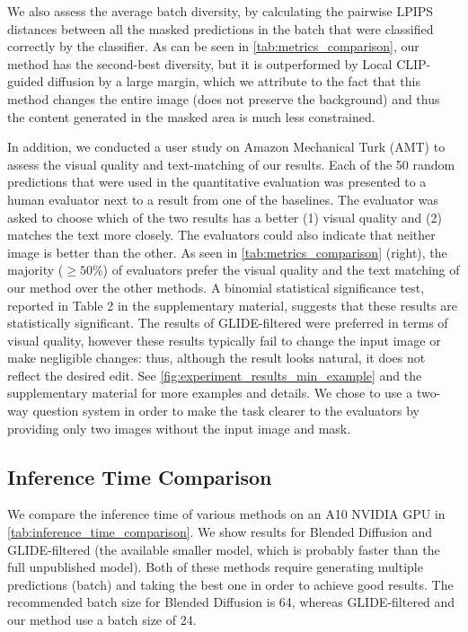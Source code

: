 We also assess the average batch diversity, by calculating the pairwise LPIPS \cite{zhang2018unreasonable} distances between all the masked predictions in the batch that were classified correctly by the classifier. As can be seen in \ref{tab:metrics_comparison}, our method has the second-best diversity, but it is outperformed by Local CLIP-guided diffusion by a large margin, which we attribute to the fact that this method changes the entire image (does not preserve the background) and thus the content generated in the masked area is much less constrained.

In addition, we conducted a user study on Amazon Mechanical Turk (AMT) \cite{amt_website} to assess the visual quality and text-matching of our results. Each of the 50 random predictions that were used in the quantitative evaluation was presented to a human evaluator next to a result from one of the baselines. The evaluator was asked to choose which of the two results has a better (1) visual quality and (2) matches the text more closely. The evaluators could also indicate that neither image is better than the other. As seen in \ref{tab:metrics_comparison} (right), the majority ($\ge 50\%$) of evaluators prefer the visual quality and the text matching of our method over the other methods. A binomial statistical significance test, reported in Table 2 in the supplementary material, suggests that these results are statistically significant. The results of GLIDE-filtered \cite{nichol2021glide} were preferred in terms of visual quality, however these results typically fail to change the input image or make negligible changes: thus, although the result looks natural, it does not reflect the desired edit. See \ref{fig:experiment_results_min_example} and the supplementary material for more examples and details. We chose to use a two-way question system in order to make the task clearer to the evaluators by providing only two images without the input image and mask.

\subsection{Inference Time Comparison}
\label{sec:inference_time_comparison}

We compare the inference time of various methods on an A10 NVIDIA GPU in \ref{tab:inference_time_comparison}. We show results for Blended Diffusion and GLIDE-filtered (the available smaller model, which is probably faster than the full unpublished model). Both of these methods require generating multiple predictions (batch) and taking the best one in order to achieve good results. The recommended batch size for Blended Diffusion is 64, whereas GLIDE-filtered and our method use a batch size of 24. 

